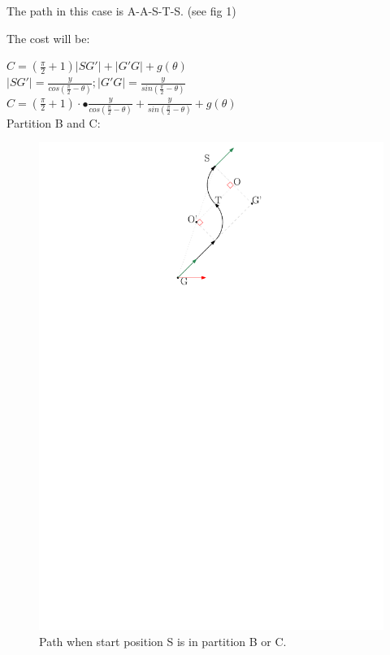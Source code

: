\documentclass[12pt]{article}
\begin{document}
  The path in this case is A-A-S-T-S. (see fig 1)
  
  The cost will be: 
  
  $C = (\frac{\pi}{2}+1)|SG'| + |G'G| + g(\theta)$\\
  
  $|SG'| = \frac{y}{cos( \frac{\pi}{2} - \theta )};    |G'G| = \frac{y}{sin( \frac{\pi}{2} - \theta )}$\\
  
  $C = (\frac{\pi}{2}+1) \cdot•\frac{y}{cos( \frac{\pi}{2} - \theta )} + \frac{y}{sin( \frac{\pi}{2} - \theta )} + g(\theta) $\\

  Partition B and C:
  
  \begin{figure}
  \centering
  \includegraphics[scale=1]{Diff_Drive_Gene_Case_3}
  \caption{Path when start position S is in partition B or C.}
  \end{figure}
  
\end{document}
